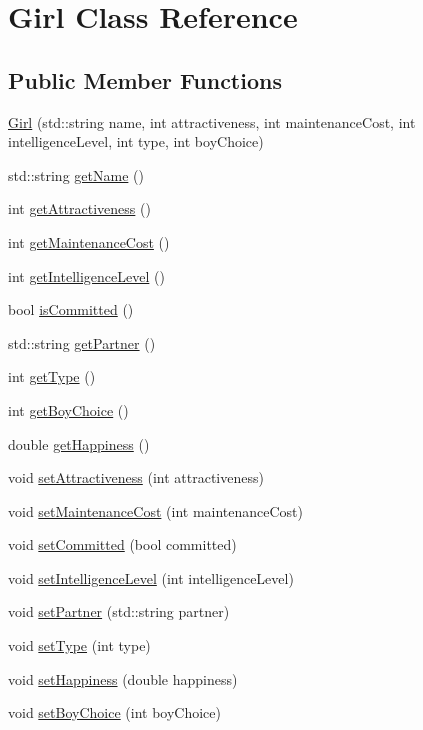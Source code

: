 \hypertarget{class_girl}{}\section{Girl Class Reference}
\label{class_girl}
\subsection*{Public Member Functions}
\begin{DoxyCompactItemize}
\item 
\hyperlink{class_girl_a1a8fcd5a2b2d09ad68b8d987a42820fa}{Girl} (std\+::string name, int attractiveness, int maintenance\+Cost, int intelligence\+Level, int type, int boy\+Choice)
\item 
std\+::string \hyperlink{class_girl_a27a705fb94b92dfd6929d0bf4bcaf5e1}{get\+Name} ()
\item 
int \hyperlink{class_girl_a04cfe3e0c21240f92c19152630a40252}{get\+Attractiveness} ()
\item 
int \hyperlink{class_girl_a8fa9751cb04f9c510a635c9f19a1d4d9}{get\+Maintenance\+Cost} ()
\item 
int \hyperlink{class_girl_a8b9ea4f67c0e682f65fb683f1c1ee766}{get\+Intelligence\+Level} ()
\item 
bool \hyperlink{class_girl_ac4768f02f66b1d124fa7da9c0d85a078}{is\+Committed} ()
\item 
std\+::string \hyperlink{class_girl_a532906e2a807138de027b2a822e91abd}{get\+Partner} ()
\item 
int \hyperlink{class_girl_acd2e75d7212ce1223945c6befff293b8}{get\+Type} ()
\item 
int \hyperlink{class_girl_a23ed372fae6fc44694d5ffa39fa455cb}{get\+Boy\+Choice} ()
\item 
double \hyperlink{class_girl_adf0956456e02324db90c009c0c3c47d3}{get\+Happiness} ()
\item 
void \hyperlink{class_girl_a8b94b6e5b0ebe961040e1c1033832588}{set\+Attractiveness} (int attractiveness)
\item 
void \hyperlink{class_girl_a585d7b2bbaec1d608e64fd29138e4632}{set\+Maintenance\+Cost} (int maintenance\+Cost)
\item 
void \hyperlink{class_girl_a7f02a69fc79e52b46161ed49f8901ecd}{set\+Committed} (bool committed)
\item 
void \hyperlink{class_girl_aeeb035a49f221a0ba3744b35e26fba3f}{set\+Intelligence\+Level} (int intelligence\+Level)
\item 
void \hyperlink{class_girl_a4f75b05e9d1362c27053248521e118be}{set\+Partner} (std\+::string partner)
\item 
void \hyperlink{class_girl_ac83625dfc5d32ef2ea53714613926c49}{set\+Type} (int type)
\item 
void \hyperlink{class_girl_a786c96c2084a8571ee04b1b38b4eb357}{set\+Happiness} (double happiness)
\item 
void \hyperlink{class_girl_a48efb2fda11ce41c74511be3bfc2510c}{set\+Boy\+Choice} (int boy\+Choice)
\end{DoxyCompactItemize}


